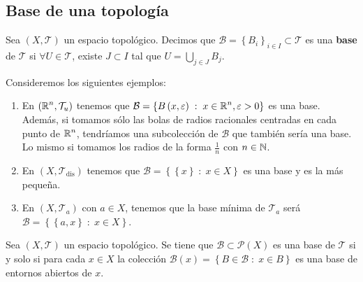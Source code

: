 \subsection{Base de una topología}

\begin{definition}
	Sea $\displaystyle \left(X, \mathcal{T}\right) $ un espacio topológico. Decimos que $\displaystyle \mathcal{B} = \left\{ B_{i}\right\} _{i \in I}\subset \mathcal{T} $ es una \textbf{base} de $\displaystyle \mathcal{T} $ si $\displaystyle \forall U \in \mathcal{T} $, existe $\displaystyle J \subset I $ tal que $\displaystyle U = \bigcup_{j \in J}B_{j} $.
\end{definition}
\begin{eg}
Consideremos los siguientes ejemplos:
\begin{enumerate}
\item En $\displaystyle \left(\mathbb{R}^{n}, \mathcal{T}_{u}\right) $ tenemos que $\displaystyle \mathcal{B} = \left\{ B\left(x, \varepsilon \right) \; : \; x \in \mathbb{R}^{n}, \varepsilon > 0\right\}  $ es una base. Además, si tomamos sólo las bolas de radios racionales centradas en cada punto de $\displaystyle \mathbb{R}^{n} $, tendríamos una subcolección de $\displaystyle \mathcal{B} $ que también sería una base. Lo mismo si tomamos los radios de la forma $\displaystyle \frac{1}{n} $ con $\displaystyle n \in \mathbb{N} $.  
\item En $\displaystyle \left(X, \mathcal{T}_{\text{dis}}\right) $ tenemos que $\displaystyle \mathcal{B}= \left\{ \left\{ x\right\}  \; : \; x \in X\right\}  $ es una base y es la más pequeña.
\item En $\displaystyle \left(X, \mathcal{T}_{a}\right) $ con $\displaystyle a \in X $, tenemos que la base mínima de $\displaystyle \mathcal{T}_{a} $ será $\displaystyle \mathcal{B}= \left\{ \left\{ a,x\right\} \; : \; x \in X \right\}  $. 
\end{enumerate}
\end{eg}
\begin{prop}
	Sea $\displaystyle \left(X, \mathcal{T}\right) $ un espacio topológico. Se tiene que $\displaystyle \mathcal{B}\subset \mathcal{P}\left(X\right) $ es una base de $\displaystyle \mathcal{T} $ si y solo si para cada $\displaystyle x \in X $ la colección $\displaystyle \mathcal{B}\left(x\right)= \left\{ B \in \mathcal{B} \; :\; x \in B\right\}  $ es una base de entornos abiertos de $\displaystyle x $.
\end{prop}
